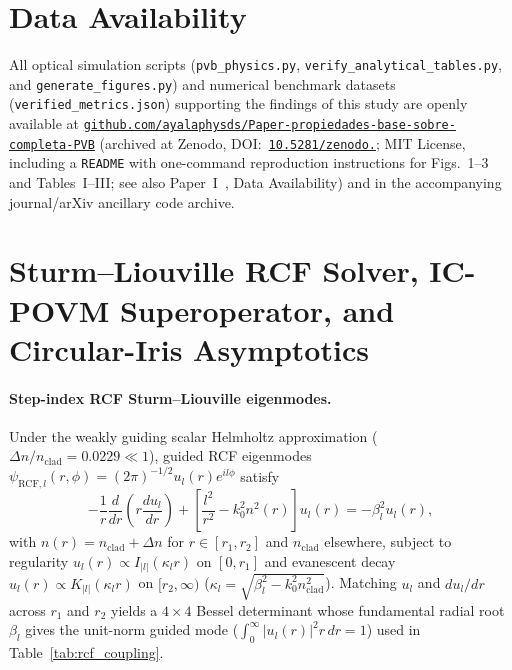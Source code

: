 \documentclass[aps,pra,reprint,nofootinbib,floatfix,longbibliography]{revtex4-2}
\newcommand{\abs}[1]{\lvert #1 \rvert}
\begin{document}
\section*{Data Availability}
{\sloppy All optical simulation scripts (\texttt{pvb\_\allowbreak physics.py}, \texttt{verify\_\allowbreak analytical\_\allowbreak tables.py}, and \texttt{generate\_\allowbreak figures.py}) and numerical benchmark datasets (\texttt{verified\_\allowbreak metrics.json}) supporting the findings of this study are openly available at \href{https://github.com/ayalaphysds/Paper-propiedades-base-sobre-completa-PVB}{\texttt{github.com/\allowbreak ayalaphysds/\allowbreak Paper-\allowbreak propiedades-\allowbreak base-\allowbreak sobre-\allowbreak completa-\allowbreak PVB}} (archived at Zenodo, DOI:~\href{https://doi.org/10.5281/zenodo.24426770}{\texttt{10.5281/\allowbreak zenodo.}}; MIT License, including a \texttt{README} with one-command reproduction instructions for Figs.~1--3 and Tables~I--III; see also Paper~I~\cite{AyalaPaperI}, Data Availability) and in the accompanying journal/arXiv ancillary code archive.\par}

\appendix

\section{Sturm--Liouville RCF Solver, IC-POVM Superoperator, and Circular-Iris Asymptotics}
\label{app:methods}

\paragraph*{Step-index RCF Sturm--Liouville eigenmodes.}
Under the weakly guiding scalar Helmholtz approximation ($\Delta n / n_{\mathrm{clad}} = 0.0229 \ll 1$), guided RCF eigenmodes $\psi_{\mathrm{RCF},l}(r,\phi) = (2\pi)^{-1/2} u_l(r) e^{il\phi}$ satisfy
\begin{equation}
-\frac{1}{r}\frac{d}{dr}\!\left(r\frac{du_l}{dr}\right) + \left[\frac{l^2}{r^2} - k_0^2 n^2(r)\right] u_l(r) = -\beta_l^2 u_l(r),
\label{eq:app_sl_ode}
\end{equation}
with $n(r) = n_{\mathrm{clad}} + \Delta n$ for $r \in [r_1, r_2]$ and $n_{\mathrm{clad}}$ elsewhere, subject to regularity $u_l(r) \propto I_{\abs{l}}(\kappa_l r)$ on $[0,r_1]$ and evanescent decay $u_l(r) \propto K_{\abs{l}}(\kappa_l r)$ on $[r_2,\infty)$ ($\kappa_l = \sqrt{\beta_l^2 - k_0^2 n_{\mathrm{clad}}^2}$). Matching $u_l$ and $du_l/dr$ across $r_1$ and $r_2$ yields a $4\times 4$ Bessel determinant whose fundamental radial root $\beta_l$ gives the unit-norm guided mode ($\int_0^\infty \abs{u_l(r)}^2 r\,dr = 1$) used in Table~\ref{tab:rcf_coupling}.
\end{document}
